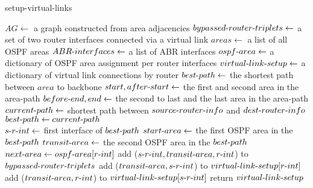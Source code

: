 \documentclass{uiucthesis2021}
\begin{document}
\begin{algorithm}[H]
\caption{setup-virtual-links}\label{alg:cap}
\begin{algorithmic}
\State $AG \gets$ a graph constructed from area adjacencies
\State $bypassed{\text-}router{\text-}triplets \gets $ a set of two router interfaces connected via a virtual link
\State $areas \gets$ a list of all OSPF areas
\State $ABR{\text-}interfaces \gets$ a list of ABR interfaces
\State $ospf{\text-}area \gets $ a dictionary of OSPF area assignment per router interfaces
\State $virtual{\text-}link{\text-}setup \gets $ a dictionary of virtual link connections by router 
    \State $best{\text-}path \gets $ the shortest path between $area$ to backbone
        \State $start, after{\text-}start \gets$ the first and second area in the area-path
        \State $before{\text-}end, end \gets$ the second to last and the last area in the area-path
                \State $current{\text-}path \gets$ shortest path between $source{\text-}router{\text-}info$ and $dest{\text-}router{\text-}info$
                    \State $best{\text-}path \gets current{\text-}path$ 
                \EndIf
            \EndFor
        \EndFor
        \\
        \State $s{\text-}r{\text-}int \gets $ first interface of $best{\text-}path$
        \State $start{\text-}area \gets$ the first OSPF area in the $best{\text-}path$
        \State $transit{\text-}area \gets$ the second OSPF area in the $best{\text-}path$
                    \State $next{\text-}area \gets ospf{\text-}area[r{\text-}int]$
                            \State add ($s{\text-}r{\text-}int, transit{\text-}area, r{\text-}int$) to $bypassed{\text-}router{\text-}triplets$
                            \State add ($transit{\text-}area, s{\text-}r{\text-}int$) to $virtual{\text-}link{\text-}setup[r{\text-}int]$
                            \State add ($transit{\text-}area, r{\text-}int$) to $virtual{\text-}link{\text-}setup[s{\text-}r{\text-}int]$
                        \EndIf
                    \EndIf
                \EndIf
            \EndIf
        \EndFor
    \EndIf
\EndFor
\State return $virtual{\text-}link{\text-}setup$
\end{algorithmic}
\end{algorithm}
\end{document}
